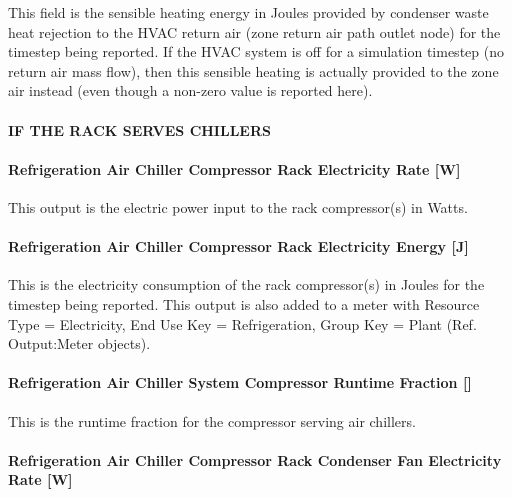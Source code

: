 This field is the sensible heating energy in Joules provided by condenser waste heat rejection to the HVAC return air (zone return air path outlet node) for the timestep being reported. If the HVAC system is off for a simulation timestep (no return air mass flow), then this sensible heating is actually provided to the zone air instead (even though a non-zero value is reported here).

\paragraph{IF THE RACK SERVES CHILLERS}\label{if-the-rack-serves-chillers}

\paragraph{Refrigeration Air Chiller Compressor Rack Electricity Rate {[}W{]}}\label{refrigeration-air-chiller-compressor-rack-electric-power-w}

This output is the electric power input to the rack compressor(s) in Watts.

\paragraph{Refrigeration Air Chiller Compressor Rack Electricity Energy {[}J{]}}\label{refrigeration-air-chiller-compressor-rack-electric-energy-j}

This is the electricity consumption of the rack compressor(s) in Joules for the timestep being reported. This output is also added to a meter with Resource Type = Electricity, End Use Key = Refrigeration, Group Key = Plant (Ref. Output:Meter objects).

\paragraph{Refrigeration Air Chiller System Compressor Runtime Fraction {[]}}\label{refrigeration-air-chiller-system-compressor-runtime-fraction}

This is the runtime fraction for the compressor serving air chillers.

\paragraph{Refrigeration Air Chiller Compressor Rack Condenser Fan Electricity Rate {[}W{]}}\label{refrigeration-air-chiller-compressor-rack-condenser-fan-electric-power-w}

